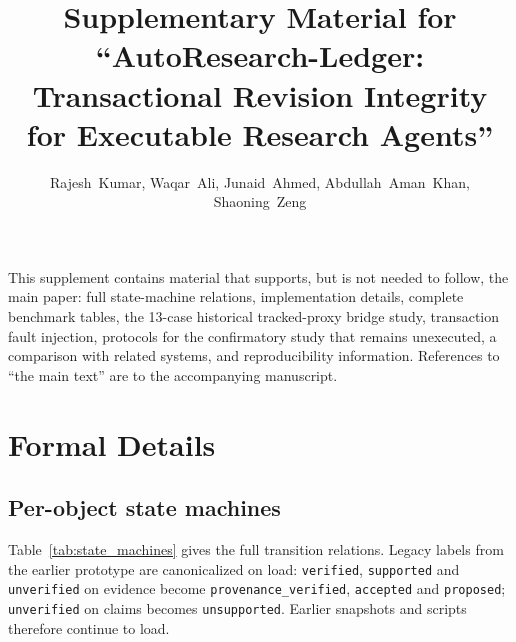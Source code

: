 \documentclass[journal]{IEEEtran}
\title{Supplementary Material for ``AutoResearch-Ledger: Transactional Revision Integrity for Executable Research Agents''}
\author{Rajesh~Kumar, Waqar~Ali, Junaid~Ahmed, Abdullah~Aman~Khan, Shaoning~Zeng}
\begin{document}
\maketitle

\noindent This supplement contains material that supports, but is not needed to follow, the main paper: full state-machine relations, implementation details, complete benchmark tables, the 13-case historical tracked-proxy bridge study, transaction fault injection, protocols for the confirmatory study that remains unexecuted, a comparison with related systems, and reproducibility information. References to ``the main text'' are to the accompanying manuscript.

\section{Formal Details}
\subsection{Per-object state machines}
Table~\ref{tab:state_machines} gives the full transition relations. Legacy labels from the earlier prototype are canonicalized on load: \texttt{verified}, \texttt{supported} and \texttt{unverified} on evidence become \texttt{provenance\_verified}, \texttt{accepted} and \texttt{proposed}; \texttt{unverified} on claims becomes \texttt{unsupported}. Earlier snapshots and scripts therefore continue to load.
\end{document}
